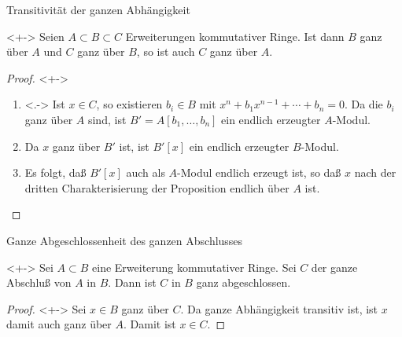 \begin{frame}{Transitivität der ganzen Abhängigkeit}
	\begin{corollary}<+->
		Seien \(A \subset B \subset C\) Erweiterungen kommutativer Ringe. 
		Ist dann \(B\) ganz über \(A\) und \(C\) ganz über \(B\), so ist
		auch \(C\) ganz über \(A\).
	\end{corollary}
	\begin{proof}<+->
		\begin{enumerate}[<+->]
		\item<.->
			Ist \(x \in C\), so existieren \(b_i \in B\) mit
			\(x^n + b_1 x^{n - 1} + \dotsb + b_n = 0\). Da die
			\(b_i\) ganz über \(A\) sind, ist \(B' = A[b_1, \dotsc, b_n]\)
			ein endlich erzeugter \(A\)-Modul.
		\item
			Da \(x\) ganz über \(B'\) ist, ist \(B'[x]\) ein endlich erzeugter
			\(B\)-Modul.
		\item
			Es folgt, daß \(B'[x]\) auch als \(A\)-Modul endlich erzeugt ist,
			so daß \(x\) nach der dritten Charakterisierung der Proposition
			endlich über \(A\) ist.
			\qedhere
		\end{enumerate}
	\end{proof}
\end{frame}

\begin{frame}{Ganze Abgeschlossenheit des ganzen Abschlusses}
	\begin{corollary}<+->
		Sei \(A \subset B\) eine Erweiterung kommutativer Ringe. Sei \(C\) der
		ganze Abschluß von \(A\) in \(B\). Dann ist \(C\) in \(B\) ganz
		abgeschlossen.
	\end{corollary}
	\begin{proof}<+->
		Sei \(x \in B\) ganz über \(C\). Da ganze Abhängigkeit transitiv ist,
		ist \(x\) damit auch ganz über \(A\). Damit ist \(x \in C\).
	\end{proof}
\end{frame}

